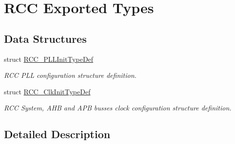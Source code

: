 \hypertarget{group___r_c_c___exported___types}{}\section{R\+CC Exported Types}
\label{group___r_c_c___exported___types}
\subsection*{Data Structures}
\begin{DoxyCompactItemize}
\item 
struct \hyperlink{struct_r_c_c___p_l_l_init_type_def}{R\+C\+C\+\_\+\+P\+L\+L\+Init\+Type\+Def}
\begin{DoxyCompactList}\small\item\em R\+CC P\+LL configuration structure definition. \end{DoxyCompactList}\item 
struct \hyperlink{struct_r_c_c___clk_init_type_def}{R\+C\+C\+\_\+\+Clk\+Init\+Type\+Def}
\begin{DoxyCompactList}\small\item\em R\+CC System, A\+HB and A\+PB busses clock configuration structure definition. \end{DoxyCompactList}\end{DoxyCompactItemize}


\subsection{Detailed Description}
